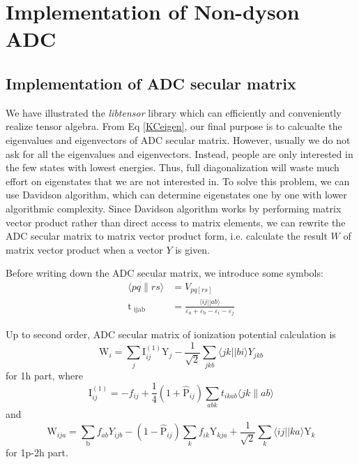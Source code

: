 \documentclass[bachelor, english]{ustcthesis}
\begin{document}
\section{Implementation of Non-dyson ADC}

\subsection{Implementation of ADC secular matrix}

We have illustrated the \emph{libtensor} library which can efficiently and conveniently realize tensor algebra.
From Eq \ref{KCeigen}, our final purpose is to calcualte the eigenvalues and eigenvectors of ADC secular matrix.
However, usually we do not ask for all the eigenvalues and eigenvectors.
Instead, people are only interested in the few states with lowest energies.
Thus, full diagonalization will waste much effort on eigenstates that we are not interested in.
To solve this problem, we can use Davidson algorithm, which can determine eigenstates one by one with lower algorithmic complexity.
Since Davidson algorithm works by performing matrix vector product rather than direct access to matrix elements, we can rewrite the ADC secular matrix to matrix vector product form, i.e. calculate the result $W$ of matrix vector product when a vector $Y$ is given.

Before writing down the ADC secular matrix, we introduce some symbols:
\begin{equation}
	\begin{aligned}
		\langle pq \| rs \rangle&=V_{pq[rs]}
		\\
		\mathrm{t}_{\text { ijab }}&=\frac{\langle i j| | a b\rangle}{\varepsilon_{a}+\varepsilon_{\mathrm{b}}-\varepsilon_{i}-\varepsilon_{j}}
	\end{aligned}
\end{equation}

Up to second order, ADC secular matrix of ionization potential calculation is
\begin{equation}
	\mathrm{W}_{i}=\sum_{j} \mathrm{I}_{i j}^{(1)} \mathrm{Y}_{j}-\frac{1}{\sqrt{2}} \sum_{j k b}\langle j k| | b i\rangle Y_{j k b}
\end{equation}
for 1h part, where
\begin{equation}
\mathrm{I}_{i j}^{(1)}=-f_{i j}+\frac{1}{4}\left(1+\hat{\mathrm{P}}_{i j}\right) \sum_{a b k} t_{i k a b}\langle j k \| a b\rangle
\end{equation}
and
\begin{equation}
	\mathrm{W}_{i j a}=\sum_{\mathrm{b}} f_{a b} Y_{i j b}-\left(1-\hat{\mathrm{P}}_{i j}\right) \sum_{k} f_{i k} \mathrm{Y}_{k j a}+\frac{1}{\sqrt{2}} \sum_{k}\langle i j| | k a\rangle \mathrm{Y}_{k}
\end{equation}
for 1p-2h part.
\end{document}
